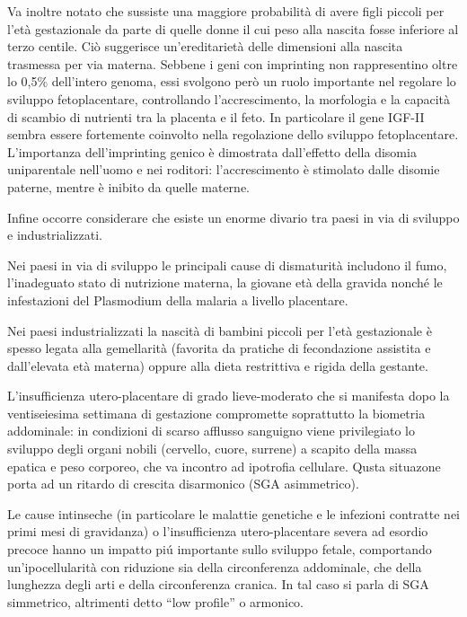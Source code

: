 Va inoltre notato che sussiste una maggiore probabilità di avere figli piccoli per l'et\`a gestazionale
da parte di quelle donne il cui peso alla nascita fosse inferiore al terzo centile.
Ciò suggerisce un'ereditarietà delle dimensioni alla nascita trasmessa per via materna. Sebbene
i geni con imprinting non rappresentino oltre lo 0,5\% dell'intero genoma, essi svolgono
però un ruolo importante nel regolare lo sviluppo fetoplacentare, controllando l'accrescimento, la 
morfologia e la capacità di scambio di nutrienti tra la placenta e il feto.
In particolare il gene IGF-II sembra essere fortemente coinvolto nella regolazione dello sviluppo
fetoplacentare. L'importanza dell'imprinting genico è dimostrata dall'effetto della disomia uniparentale
nell'uomo e nei roditori: l'accrescimento è stimolato dalle disomie paterne, mentre \`e inibito da quelle materne.\cite{fowden2006imprinted}


Infine occorre considerare che esiste un enorme divario tra paesi in via di sviluppo e industrializzati.


Nei paesi in via di sviluppo le principali cause di dismaturità includono il fumo, l'inadeguato stato di 
nutrizione materna, la giovane età della gravida nonché le infestazioni del Plasmodium della malaria a 
livello placentare.


Nei paesi industrializzati la nascità di bambini piccoli per l'età gestazionale
è spesso legata alla gemellarità (favorita da pratiche di fecondazione assistita
e dall'elevata età materna) oppure alla dieta restrittiva e rigida della gestante.


L'insufficienza utero-placentare di grado lieve-moderato che si manifesta dopo la 
ventiseiesima settimana di gestazione compromette soprattutto la biometria addominale: 
in condizioni di scarso afflusso sanguigno viene privilegiato lo sviluppo degli 
organi nobili (cervello, cuore, surrene) a scapito della massa epatica e peso corporeo, che va incontro ad ipotrofia cellulare. 
Qusta situazone porta ad un ritardo di crescita disarmonico (SGA asimmetrico).


Le cause intinseche (in particolare le malattie genetiche e le infezioni contratte 
nei primi mesi di gravidanza) o l'insufficienza utero-placentare severa ad esordio 
precoce hanno un impatto pi\'u importante sullo sviluppo fetale, comportando un'ipocellularità con 
riduzione sia della circonferenza addominale, che della lunghezza degli arti e 
della circonferenza cranica. In tal caso si parla di SGA simmetrico, altrimenti detto "`low profile"' o armonico.


